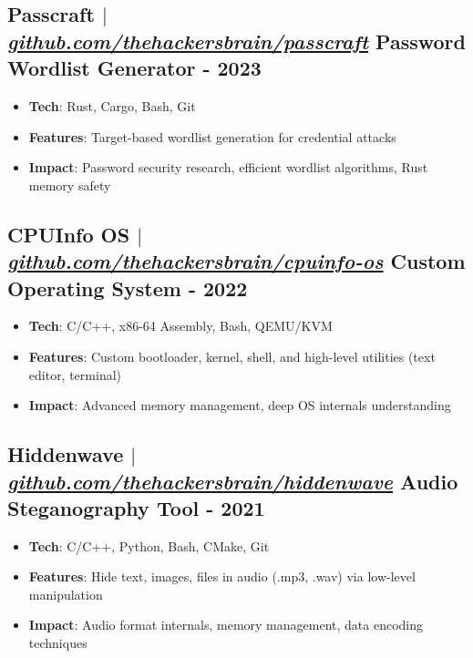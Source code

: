 \documentclass[11pt]{article}
\newcommand{\projectSubheading}[4]{
    \subsection{#1 $|$ \normalfont\textit{\href{#2}{#3}} \hfill #4}
    \vspace{3pt}
}
\begin{document}
\projectSubheading
    {Passcraft}{https://github.com/thehackersbrain/passcraft}{github.com/thehackersbrain/passcraft}
    {Password Wordlist Generator - \textbf{2023}}
\begin{itemize}
    \item \textbf{Tech}: Rust, Cargo, Bash, Git
    \item \textbf{Features}: Target-based wordlist generation for credential attacks
    \item \textbf{Impact}: Password security research, efficient wordlist algorithms, Rust memory safety
\end{itemize}
\vspace{3pt}

\projectSubheading
    {CPUInfo OS}{https://github.com/thehackersbrain/cpuinfo-os}{github.com/thehackersbrain/cpuinfo-os}
    {Custom Operating System - \textbf{2022}}
\begin{itemize}
    \item \textbf{Tech}: C/C++, x86-64 Assembly, Bash, QEMU/KVM
    \item \textbf{Features}: Custom bootloader, kernel, shell, and high-level utilities (text editor, terminal)
    \item \textbf{Impact}: Advanced memory management, deep OS internals understanding
\end{itemize}
\vspace{3pt}

\projectSubheading
    {Hiddenwave}{https://github.com/thehackersbrain/hiddenwave}{github.com/thehackersbrain/hiddenwave}
    {Audio Steganography Tool - \textbf{2021}}
\begin{itemize}
    \item \textbf{Tech}: C/C++, Python, Bash, CMake, Git
    \item \textbf{Features}: Hide text, images, files in audio (.mp3, .wav) via low-level manipulation
    \item \textbf{Impact}: Audio format internals, memory management, data encoding techniques
\end{itemize}
\vspace{3pt}
\end{document}
